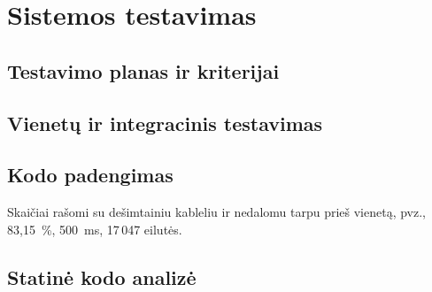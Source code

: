 \section{Sistemos testavimas}

\subsection{Testavimo planas ir kriterijai}

\lipsum[1]

\subsection{Vienetų ir integracinis testavimas}

\lipsum[2]

\subsection{Kodo padengimas}

Skaičiai rašomi su dešimtainiu kableliu ir nedalomu tarpu prieš vienetą, pvz., 83{,}15~\%, 500~ms, 17\,047 eilutės.

\subsection{Statinė kodo analizė}

\lipsum[3]
